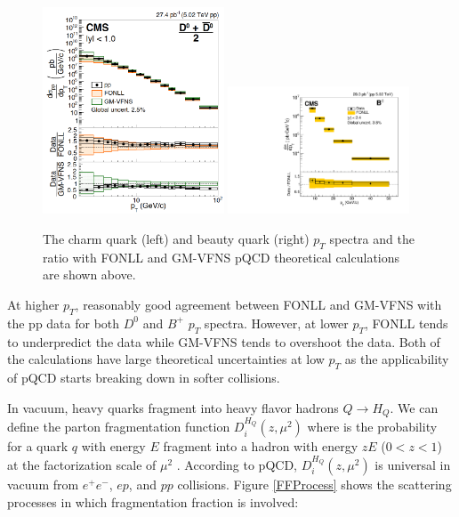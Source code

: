  \begin{figure}[hbtp]
\begin{center}
\includegraphics[width=0.48\textwidth]{Figures/Chapter1/pQCDppD0.png}
\includegraphics[width=0.48\textwidth]{Figures/Chapter1/pQCDppBP.pdf}
\caption{The charm quark (left) and beauty quark (right) $p_T$ spectra and the ratio with FONLL and GM-VFNS pQCD theoretical calculations are shown above.}
\label{pQCDppComp}
\end{center}
\end{figure}   

At higher $p_T$, reasonably good agreement between FONLL and GM-VFNS with the pp data for both $D^0$ and $B^+$ $p_T$ spectra. However, at lower $p_T$, FONLL tends to underpredict the data while GM-VFNS tends to overshoot the data. Both of the calculations have large theoretical uncertainties at low $p_T$ as the applicability of pQCD starts breaking down in softer collisions. 
 
In vacuum, heavy quarks fragment into heavy flavor hadrons $Q \rightarrow H_Q$. We can define the parton fragmentation function $D^{H_Q}_{i}(z,\mu^2)$ where is the probability for a quark $q$ with energy $E$ fragment into a hadron with energy $zE$ ($0 < z < 1$) at the factorization scale of $\mu^2$ \cite{QCDFFunc}. According to pQCD, $D^{H_Q}_{i}(z,\mu^2)$ is universal in vacuum from $e^+e^-$, $ep$, and $pp$ collisions. Figure \ref{FFProcess} shows the scattering processes in which fragmentation fraction is involved:

